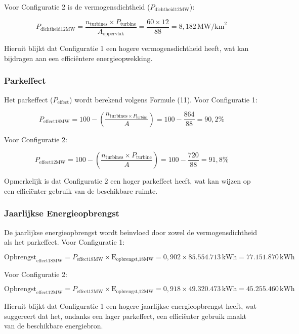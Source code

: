 Voor Configuratie 2 is de vermogensdichtheid (\(P_{\text{dichtheid12MW}}\)):

\begin{equation} \label{eq:19}
P_{\text{dichtheid12MW}} = \frac{{n_{\text{turbines}} \times P_{\text{turbine}}}}{{A_{\text{oppervlak}}}} = \frac{{60 \times 12}}{{88}} = 8,182 \, \text{MW/km}^2
\end{equation}

Hieruit blijkt dat Configuratie 1 een hogere vermogensdichtheid heeft, wat kan bijdragen aan een efficiëntere energieopwekking.

\subsubsection{Parkeffect}

Het parkeffect (\(P_{\text{effect}}\)) wordt berekend volgens Formule (11). Voor Configuratie 1:

\begin{equation} \label{eq:20}
P_{\text{effect18MW}} = 100 - \left(\frac{{n_{\text{turbines} \times P_{\text{turbine}}}}}{{A}} \right) = 100 - \frac{{864}}{{88}} = 90,2\%
\end{equation}

Voor Configuratie 2:

\begin{equation} \label{eq:21}
P_{\text{effect12MW}} = 100 - \left(\frac{{n_{\text{turbines}} \times P_{\text{turbine}}}}{{A}} \right) = 100 - \frac{{720}}{{88}} = 91,8\%
\end{equation}

Opmerkelijk is dat Configuratie 2 een hoger parkeffect heeft, wat kan wijzen op een efficiënter gebruik van de beschikbare ruimte.

\subsubsection{Jaarlijkse Energieopbrengst}

De jaarlijkse energieopbrengst wordt beïnvloed door zowel de vermogensdichtheid als het parkeffect. Voor Configuratie 1:

\begin{equation} \label{eq:22}
\text{Opbrengst}_{\text{effect18MW}} = P_{\text{effect18MW}} \times \text{E}_{\text{opbrengst,18MW}} = 0,902 \times 85.554.713 \, \text{kWh} = 77.151.870 \, \text{kWh}
\end{equation}

Voor Configuratie 2:

\begin{equation} \label{eq:23}
\text{Opbrengst}_{\text{effect12MW}} = P_{\text{effect12MW}} \times \text{E}_{\text{opbrengst,12MW}} = 0,918 \times 49.320.473 \, \text{kWh} = 45.255.460 \, \text{kWh}
\end{equation}

Hieruit blijkt dat Configuratie 1 een hogere jaarlijkse energieopbrengst heeft, wat suggereert dat het, ondanks een lager parkeffect, een efficiënter gebruik maakt van de beschikbare energiebron.
